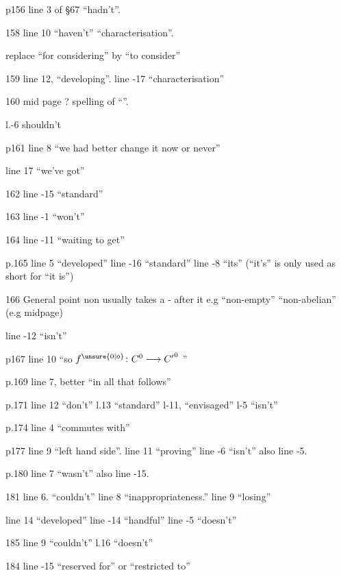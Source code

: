 
p156 line 3 of \S67 ``hadn't''.

158 line 10 ``haven't'' ``characterisation''.

replace ``for considering'' by ``to consider''

159 line 12, ``developing''. line -17 ``characterisation''

160 mid page ? spelling of ``''.

l.-6 shouldn't

p161 line 8  ``we had better change it now or never''

line 17 ``we've got''

162 line -15 ``standard'' 

163 line -1 ``won't''

164 line -11 ``waiting to get''

p.165 line 5 ``developed'' line -16 ``standard'' line -8 ``its'' (``it's'' is only used as short for ``it is'')

166 General point non usually takes a - after it e.g ``non-empty'' ``non-abelian'' (e.g midpage)

line -12 ``isn't''

p167 line 10 ``so  $f^{\unsure{0|o}}\colon C^0\longrightarrow {C'}^0$ ''

p.169 line 7, better ``in all that follows'' 

p.171 line 12 ``don't'' l.13 ``standard'' l-11, ``envisaged'' l-5 ``isn't''

p.174 line 4 ``commutes with''

p177 line 9 ``left hand side''. line 11 ``proving'' line -6 ``isn't'' also line -5.

p.180 line 7 ``wasn't'' also line -15.

181 line 6. ``couldn't'' line 8 ``inappropriateness.'' line 9 ``losing''

line 14 ``developed'' line -14 ``handful'' line -5 ``doesn't''

185 line 9 ``couldn't'' l.16 ``doesn't''

184 line -15 ``reserved for'' or ``restricted to''

